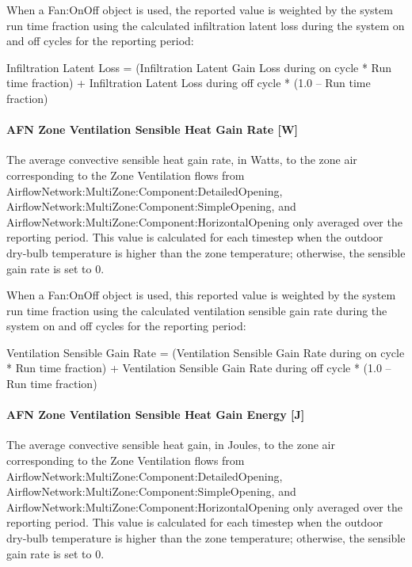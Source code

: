 When a Fan:OnOff object is used, the reported value is weighted by the system run time fraction using the calculated infiltration latent loss during the system on and off cycles for the reporting period:

Infiltration Latent Loss = (Infiltration Latent Gain Loss during on cycle * Run time fraction) + Infiltration Latent Loss during off cycle * (1.0 -- Run time fraction)

\paragraph{AFN Zone Ventilation Sensible Heat Gain Rate {[}W{]}}\label{afn-zone-ventilation-sensible-heat-gain-rate-w}

The average convective sensible heat gain rate, in Watts, to the zone air corresponding to the Zone Ventilation flows from AirflowNetwork:MultiZone:Component:DetailedOpening, AirflowNetwork:MultiZone:Component:SimpleOpening, and AirflowNetwork:MultiZone:Component:HorizontalOpening only averaged over the reporting period. This value is calculated for each timestep when the outdoor dry-bulb temperature is higher than the zone temperature; otherwise, the sensible gain rate is set to 0.

When a Fan:OnOff object is used, this reported value is weighted by the system run time fraction using the calculated ventilation sensible gain rate during the system on and off cycles for the reporting period:

Ventilation Sensible Gain Rate = (Ventilation Sensible Gain Rate during on cycle * Run time fraction) + Ventilation Sensible Gain Rate during off cycle * (1.0 -- Run time fraction)

\paragraph{AFN Zone Ventilation Sensible Heat Gain Energy {[}J{]}}\label{afn-zone-Ventilation-sensible-heat-gain-energy-j}

The average convective sensible heat gain, in Joules, to the zone air corresponding to the Zone Ventilation flows from AirflowNetwork:MultiZone:Component:DetailedOpening, AirflowNetwork:MultiZone:Component:SimpleOpening, and AirflowNetwork:MultiZone:Component:HorizontalOpening only averaged over the reporting period. This value is calculated for each timestep when the outdoor dry-bulb temperature is higher than the zone temperature; otherwise, the sensible gain rate is set to 0.

